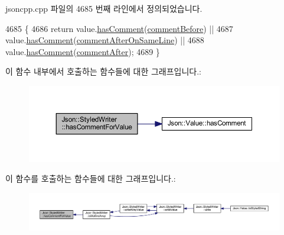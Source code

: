 jsoncpp.\+cpp 파일의 4685 번째 라인에서 정의되었습니다.


\begin{DoxyCode}
4685                                                         \{
4686   \textcolor{keywordflow}{return} value.\hyperlink{class_json_1_1_value_a65d8e3ab6a5871cbd019a3e0f0b944a3}{hasComment}(\hyperlink{namespace_json_a4fc417c23905b2ae9e2c47d197a45351a52f1733775460517b2ea6bedf4906d52}{commentBefore}) ||
4687          value.\hyperlink{class_json_1_1_value_a65d8e3ab6a5871cbd019a3e0f0b944a3}{hasComment}(\hyperlink{namespace_json_a4fc417c23905b2ae9e2c47d197a45351a008a230a0586de54f30b76afe70fdcfa}{commentAfterOnSameLine}) ||
4688          value.\hyperlink{class_json_1_1_value_a65d8e3ab6a5871cbd019a3e0f0b944a3}{hasComment}(\hyperlink{namespace_json_a4fc417c23905b2ae9e2c47d197a45351ac5784ca53b12250888ddb642b06aebef}{commentAfter});
4689 \}
\end{DoxyCode}
이 함수 내부에서 호출하는 함수들에 대한 그래프입니다.\+:\nopagebreak
\begin{figure}[H]
\begin{center}
\leavevmode
\includegraphics[width=350pt]{class_json_1_1_styled_writer_a37a806d010f708cb68556f2666f79bdf_cgraph}
\end{center}
\end{figure}
이 함수를 호출하는 함수들에 대한 그래프입니다.\+:\nopagebreak
\begin{figure}[H]
\begin{center}
\leavevmode
\includegraphics[width=350pt]{class_json_1_1_styled_writer_a37a806d010f708cb68556f2666f79bdf_icgraph}
\end{center}
\end{figure}
\mbox{\label{class_json_1_1_styled_writer_a0b65be6186a7c6638270990265e42b97}} 

